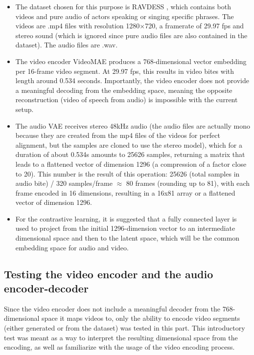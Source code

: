 \documentclass[12pt]{article}
\begin{document}
\begin{itemize}
\item The dataset chosen for this purpose is RAVDESS \cite{RAVDESS}, which contains both videos and pure audio of actors speaking or singing specific phrases. The videos are .mp4 files with resolution 1280×720, a framerate of 29.97 fps and stereo sound (which is ignored since pure audio files are also contained in the dataset). The audio files are .wav.
\item The video encoder VideoMAE \cite{VideoMAE} produces a 768-dimensional vector embedding per 16-frame video segment. At 29.97 fps, this results in video bites with length around 0.534 seconds. Importantly, the video encoder does not provide a meaningful decoding from the embedding space, meaning the opposite reconstruction (video of speech from audio) is impossible with the current setup. 
\item The audio VAE \cite{EnCodec} receives stereo 48kHz audio (the audio files are actually mono because they are created from the mp4 files of the videos for perfect alignment, but the samples are cloned to use the stereo model), which for a duration of about 0.534s amounts to 25626 samples, returning a matrix that leads to a flattened vector of dimension 1296 (a compression of a factor close to 20). This number is the result of this operation: 25626 (total samples in audio bite) / 320 samples/frame $\approx$ 80 frames (rounding up to 81), with each frame encoded in 16 dimensions, resulting in a 16x81 array or a flattened vector of dimension 1296. 
\item For the contrastive learning, it is suggested that a fully connected layer is used to project from the initial 1296-dimension vector to an intermediate dimensional space and then to the latent space, which will be the common embedding space for audio and video.
\end{itemize}

\subsection{Testing the video encoder and the audio encoder-decoder}

Since the video encoder \cite{VideoMAE} does not include a meaningful decoder from the 768-dimensional space it maps videos to, only the ability to encode video segments (either generated or from the dataset) was tested in this part. This introductory test was meant as a way to interpret the resulting dimensional space from the encoding, as well as familiarize with the usage of the video encoding process. 
\end{document}

